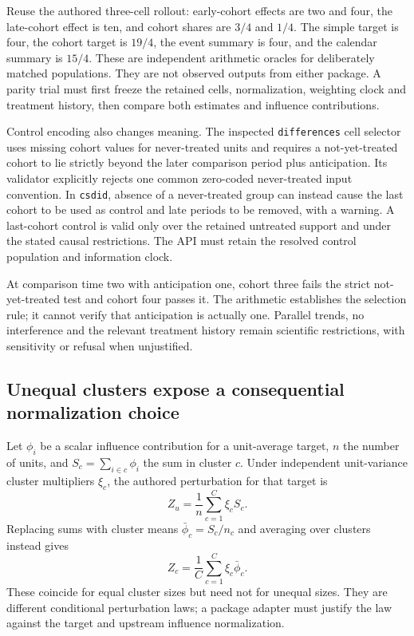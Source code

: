 Reuse the authored three-cell rollout: early-cohort effects are two and four,
the late-cohort effect is ten, and cohort shares are $3/4$ and $1/4$.
The simple target is four, the cohort target is $19/4$, the event summary is
four, and the calendar summary is $15/4$. These are independent arithmetic
oracles for deliberately matched populations. They are not observed outputs
from either package. A parity trial must first freeze the retained cells,
normalization, weighting clock and treatment history, then compare both
estimates and influence contributions.
\citep{exec24_panelpy_contract}

Control encoding also changes meaning. The inspected \texttt{differences}
cell selector uses missing cohort values for never-treated units and requires
a not-yet-treated cohort to lie strictly beyond the later comparison period
plus anticipation. Its validator explicitly rejects one common zero-coded
never-treated input convention. In \texttt{csdid}, absence of a never-treated
group can instead cause the last cohort to be used as control and late
periods to be removed, with a warning. A last-cohort control is valid only
over the retained untreated support and under the stated causal restrictions.
The API must retain the resolved control population and information clock.
\citep{exec24_panelpy_differences,exec24_panelpy_csdid}

At comparison time two with anticipation one, cohort three fails the strict
not-yet-treated test and cohort four passes it. The arithmetic establishes
the selection rule; it cannot verify that anticipation is actually one.
Parallel trends, no interference and the relevant treatment history remain
scientific restrictions, with sensitivity or refusal when unjustified.
\citep{exec24_panelpy_contract}

\subsection{Unequal clusters expose a consequential normalization choice}
Let $\phi_i$ be a scalar influence contribution for a unit-average target,
$n$ the number of units, and $S_c=\sum_{i\in c}\phi_i$ the sum in cluster
$c$. Under independent unit-variance cluster multipliers $\xi_c$, the
authored perturbation for that target is
\[ Z_u=\frac{1}{n}\sum_{c=1}^{C}\xi_c S_c. \]
Replacing sums with cluster means $\bar\phi_c=S_c/n_c$ and averaging over
clusters instead gives
\[ Z_c=\frac{1}{C}\sum_{c=1}^{C}\xi_c\bar\phi_c. \]
These coincide for equal cluster sizes but need not for unequal sizes.
They are different conditional perturbation laws; a package adapter must
justify the law against the target and upstream influence normalization.
\citep{exec24_panelpy_contract}

